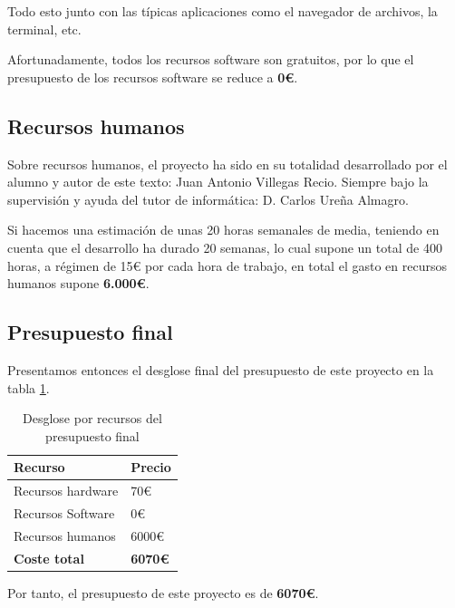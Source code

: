 Todo esto junto con las típicas aplicaciones como el navegador de archivos, la terminal, etc.

Afortunadamente, todos los recursos software son gratuitos, por lo que el presupuesto de los recursos software se reduce a \textbf{0€}.

\subsection*{Recursos humanos}

Sobre recursos humanos, el proyecto ha sido en su totalidad desarrollado por el alumno y autor de este texto: Juan Antonio Villegas Recio. Siempre bajo la supervisión y ayuda del tutor de informática: D. Carlos Ureña Almagro.

Si hacemos una estimación de unas 20 horas semanales de media, teniendo en cuenta que el desarrollo ha durado 20 semanas, lo cual supone un total de 400 horas, a régimen de 15€ por cada hora de trabajo, en total el gasto en recursos humanos supone \textbf{6.000€}.

\subsection*{Presupuesto final}

Presentamos entonces el desglose final del presupuesto de este proyecto en la tabla \ref{tab:presupuestos}.

\begin{table}[ht]
    \centering
    \begin{tabular}{ll}
    \hline
    \textbf{Recurso}     & \textbf{Precio} \\ \hline
    Recursos hardware    & 70€             \\ \hline
    Recursos Software    & 0€              \\ \hline
    Recursos humanos     & 6000€           \\ \hline
    \textbf{Coste total} & \textbf{6070€}  \\ \hline
    \end{tabular}
    \caption{Desglose por recursos del presupuesto final}
    \label{tab:presupuestos}
\end{table}

Por tanto, el presupuesto de este proyecto es de \textbf{6070€}.